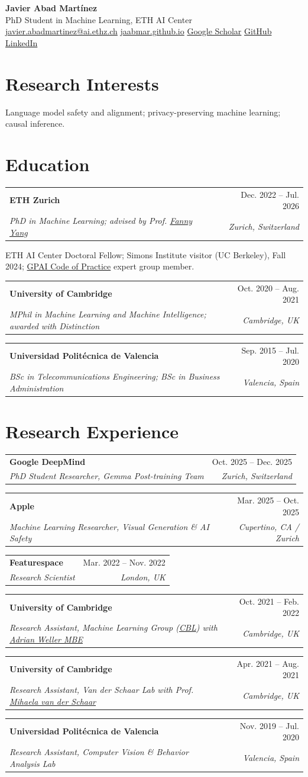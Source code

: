 \documentclass[letterpaper,10pt]{article}
\makeatletter
\newcommand{\namefont}{\LARGE\bfseries}
\newcommand{\entryfont}{\fontsize{10.55}{10.95}\selectfont\bfseries}
\newcommand{\detailfont}{\fontsize{9.0}{9.8}\selectfont}
\newcommand{\rowgap}{\vspace{3.0pt}}
\newcommand{\entry}[4]{%
  \begin{tabular*}{\textwidth}{@{}p{0.74\textwidth}@{\extracolsep{\fill}}r@{}}
    {\entryfont #1} & #2 \\
    \textit{#3} & \textit{#4}
  \end{tabular*}\par\rowgap
}
\newcommand{\detail}[1]{%
  {\detailfont #1}\par\rowgap
}
\makeatother
\begin{document}
\fontsize{10.15}{10.95}\selectfont

\begin{center}
  {\namefont Javier Abad Martínez}\\[2pt]
  PhD Student in Machine Learning, ETH AI Center\\[1pt]
  \href{mailto:javier.abadmartinez@ai.ethz.ch}{javier.abadmartinez@ai.ethz.ch}
  \quad \href{https://jaabmar.github.io}{jaabmar.github.io}
  \quad \href{https://scholar.google.es/citations?user=gGHkUhkAAAAJ&hl=es}{Google Scholar}
  \quad \href{https://github.com/jaabmar}{GitHub}
  \quad \href{https://www.linkedin.com/in/javiabadm/}{LinkedIn}
\end{center}
\vspace{-7pt}

\section*{Research Interests}
Language model safety and alignment; privacy-preserving machine learning; causal inference.

\section*{Education}
\entry{ETH Zurich}{Dec. 2022 -- Jul. 2026}{PhD in Machine Learning; advised by Prof. \href{https://sml.inf.ethz.ch/group/fannyy/}{Fanny Yang}}{Zurich, Switzerland}
\detail{ETH AI Center Doctoral Fellow; Simons Institute visitor (UC Berkeley), Fall 2024; \href{https://digital-strategy.ec.europa.eu/en/policies/contents-code-gpai}{GPAI Code of Practice} expert group member.}
\entry{University of Cambridge}{Oct. 2020 -- Aug. 2021}{MPhil in Machine Learning and Machine Intelligence; awarded with Distinction}{Cambridge, UK}
\entry{Universidad Politécnica de Valencia}{Sep. 2015 -- Jul. 2020}{BSc in Telecommunications Engineering; BSc in Business Administration}{Valencia, Spain}

\section*{Research Experience}
\entry{Google DeepMind}{Oct. 2025 -- Dec. 2025}{PhD Student Researcher, Gemma Post-training Team}{Zurich, Switzerland}
\entry{Apple}{Mar. 2025 -- Oct. 2025}{Machine Learning Researcher, Visual Generation \& AI Safety}{Cupertino, CA / Zurich}
\entry{Featurespace}{Mar. 2022 -- Nov. 2022}{Research Scientist}{London, UK}
\entry{University of Cambridge}{Oct. 2021 -- Feb. 2022}{Research Assistant, Machine Learning Group (\href{https://cbl.eng.cam.ac.uk/}{CBL}) with \href{https://mlg.eng.cam.ac.uk/adrian/}{Adrian Weller MBE}}{Cambridge, UK}
\entry{University of Cambridge}{Apr. 2021 -- Aug. 2021}{Research Assistant, Van der Schaar Lab with Prof. \href{https://www.vanderschaar-lab.com/prof-mihaela-van-der-schaar/}{Mihaela van der Schaar}}{Cambridge, UK}
\entry{Universidad Politécnica de Valencia}{Nov. 2019 -- Jul. 2020}{Research Assistant, Computer Vision \& Behavior Analysis Lab}{Valencia, Spain}
\end{document}
